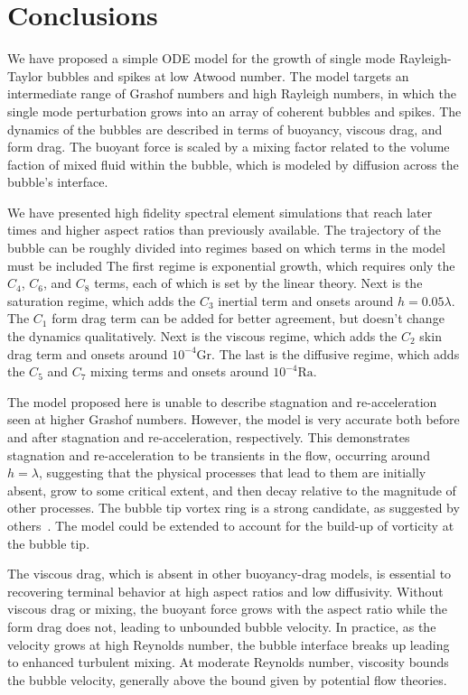 \section{Conclusions} 

We have proposed a simple ODE model for the growth of single mode Rayleigh-Taylor bubbles and spikes at low Atwood number.
The model targets an intermediate range of Grashof numbers and high Rayleigh numbers, in which the single mode perturbation grows into an array of coherent bubbles and spikes.
The dynamics of the bubbles are described in terms of buoyancy, viscous drag, and form drag.
The buoyant force is scaled by a mixing factor related to the volume faction of mixed fluid within the bubble, which is modeled by diffusion across the bubble's interface.

We have presented high fidelity spectral element simulations that reach later times and higher aspect ratios than previously available.
The trajectory of the bubble can be roughly divided into regimes based on which terms in the model must be included
The first regime is exponential growth, which requires only the $C_4$, $C_6$, and $C_8$ terms, each of which is set by the linear theory.
Next is the saturation regime, which adds the $C_3$ inertial term and onsets around $h = 0.05 \lambda$.
The $C_1$ form drag term can be added for better agreement, but doesn't change the dynamics qualitatively.
Next is the viscous regime, which adds the $C_2$ skin drag term and onsets around $10^{-4} \text{Gr}$.
The last is the diffusive regime, which adds the $C_5$ and $C_7$ mixing terms and onsets around $10^{-4} \text{Ra}$.

The model proposed here is unable to describe stagnation and re-acceleration seen at higher Grashof numbers.
However, the model is very accurate both before and after stagnation and re-acceleration, respectively.
This demonstrates stagnation and re-acceleration to be transients in the flow, occurring around $h = \lambda$, suggesting that the physical processes that lead to them are initially absent, grow to some critical extent, and then decay relative to the magnitude of other processes.
The bubble tip vortex ring is a strong candidate, as suggested by others~\cite{Banerjee2011, Ramaprabhu2012}.
The model could be extended to account for the build-up of vorticity at the bubble tip.

The viscous drag, which is absent in other buoyancy-drag models, is essential to recovering terminal behavior at high aspect ratios and low diffusivity.  
Without viscous drag or mixing, the buoyant force grows with the aspect ratio while the form drag does not, leading to unbounded bubble velocity.
In practice, as the velocity grows at high Reynolds number, the bubble interface breaks up leading to enhanced turbulent mixing.
At moderate Reynolds number, viscosity bounds the bubble velocity, generally above the bound given by potential flow theories.

